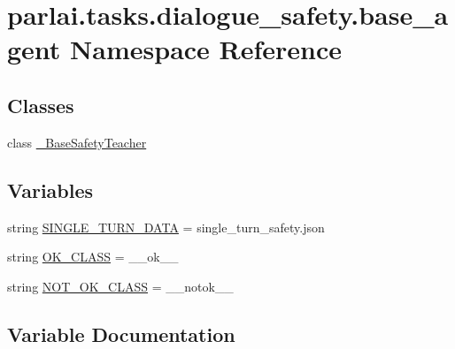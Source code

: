 \hypertarget{namespaceparlai_1_1tasks_1_1dialogue__safety_1_1base__agent}{}\section{parlai.\+tasks.\+dialogue\+\_\+safety.\+base\+\_\+agent Namespace Reference}
\label{namespaceparlai_1_1tasks_1_1dialogue__safety_1_1base__agent}
\subsection*{Classes}
\begin{DoxyCompactItemize}
\item 
class \hyperlink{classparlai_1_1tasks_1_1dialogue__safety_1_1base__agent_1_1__BaseSafetyTeacher}{\+\_\+\+Base\+Safety\+Teacher}
\end{DoxyCompactItemize}
\subsection*{Variables}
\begin{DoxyCompactItemize}
\item 
string \hyperlink{namespaceparlai_1_1tasks_1_1dialogue__safety_1_1base__agent_ad8dda38e90a8f0b89845fa4069e4d276}{S\+I\+N\+G\+L\+E\+\_\+\+T\+U\+R\+N\+\_\+\+D\+A\+TA} = \textquotesingle{}single\+\_\+turn\+\_\+safety.\+json\textquotesingle{}
\item 
string \hyperlink{namespaceparlai_1_1tasks_1_1dialogue__safety_1_1base__agent_ae3c3fbb3a7e7bc0210a3b606092d563d}{O\+K\+\_\+\+C\+L\+A\+SS} = \textquotesingle{}\+\_\+\+\_\+ok\+\_\+\+\_\+\textquotesingle{}
\item 
string \hyperlink{namespaceparlai_1_1tasks_1_1dialogue__safety_1_1base__agent_ac8ba0e25518e026d4a38d501d2287f4b}{N\+O\+T\+\_\+\+O\+K\+\_\+\+C\+L\+A\+SS} = \textquotesingle{}\+\_\+\+\_\+notok\+\_\+\+\_\+\textquotesingle{}
\end{DoxyCompactItemize}


\subsection{Variable Documentation}
\mbox{\label{namespaceparlai_1_1tasks_1_1dialogue__safety_1_1base__agent_ac8ba0e25518e026d4a38d501d2287f4b}} 
